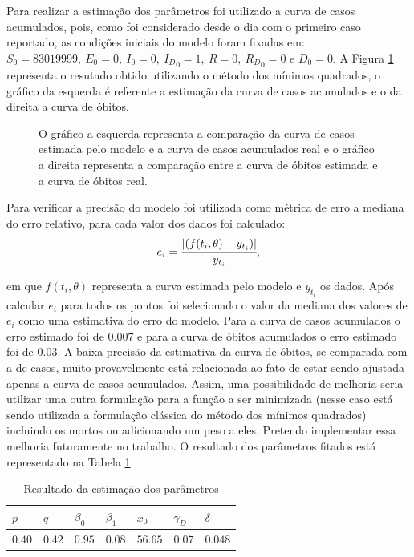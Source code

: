 \documentclass[12pt]{article}
\begin{document}
Para realizar a estimação dos parâmetros foi utilizado a curva de casos acumulados, pois, como foi considerado desde o dia com o primeiro caso reportado, as condições iniciais do modelo foram fixadas em: $S_0 = 83019999, \ E_0 = 0, \ I_0 = 0, \ {I_D}_0 = 1, \ R=0, \ {R_D}_0 =0$ e $D_0 = 0$. A Figura \ref{fitting1onda} representa o resutado obtido utilizando o método dos mínimos quadrados, o gráfico da esquerda é referente a estimação da curva de casos acumulados e o da direita a curva de óbitos. 

\begin{figure}[h!]
    \centering
    
    
    \caption{O gráfico a esquerda representa a comparação da curva de casos estimada pelo modelo e a curva de casos acumulados real e o gráfico a direita representa a comparação entre a curva de óbitos estimada e a curva de óbitos real.}
    \label{fitting1onda}
\end{figure}

Para verificar a precisão do modelo foi utilizada como métrica de erro a mediana do erro relativo, para cada valor dos dados foi calculado:
$$e_i = \cfrac{ \vert (f(t_i, \theta) - y_{t_i})\vert}{y_{t_i}}, $$

em que $f(t_i, \theta)$ representa a curva estimada pelo modelo e $y_{t_i}$ os dados. Após calcular $e_i$ para todos os pontos foi selecionado o valor da mediana dos valores de $e_i$ como uma estimativa do erro do modelo. 
Para a curva de casos acumulados o erro estimado foi de $0.007 $ e para a curva de óbitos acumulados o erro estimado foi de  $0.03$. A baixa precisão da estimativa da curva de óbitos, se comparada com a de casos, muito provavelmente está relacionada ao fato de estar sendo ajustada apenas a curva de casos acumulados. Assim, uma possibilidade de melhoria seria utilizar uma outra formulação para a função a ser minimizada (nesse caso está sendo utilizada a formulação clássica do método dos mínimos quadrados) incluindo os mortos ou adicionando um peso a eles. Pretendo implementar essa melhoria futuramente no trabalho. O resultado dos parâmetros fitados está representado na Tabela \ref{resparam1}. 

\begin{table}[h]
\label{resparam1}
\centering
\begin{small}
\caption{Resultado da estimação dos parâmetros}
\begin{tabular}{|p{2cm}|p{2cm}|p{2cm}|p{2cm}|p{2cm}|p{2cm}|p{2cm}|}
\hline
 $p$ & $q$ & $\beta_0$ & $\beta_1$ & $x_0$ & $\gamma_D$ & $\delta$\\
\hline
 $0.40$ & $0.42$ & $0.95$ & $0.08$ & $56.65$ & $0.07$ & $0.048$\\
\hline
\end{tabular}
\end{small}
\end{table}
\end{document}
